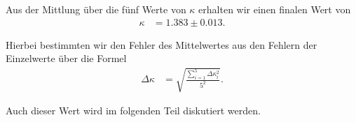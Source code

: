 Aus der Mittlung über die fünf Werte von $\kappa$ erhalten wir einen finalen Wert von
\begin{align}
  \kappa &= 1.383 \pm 0.013.
\end{align}

Hierbei bestimmten wir den Fehler des Mittelwertes aus den Fehlern der Einzelwerte über die Formel
\begin{align}
  \Delta \kappa &= \sqrt{\frac{\sum_{i = 1}^{5} \Delta \kappa^2_i}{5^2}}.
\end{align}

Auch dieser Wert wird im folgenden Teil diskutiert werden.
